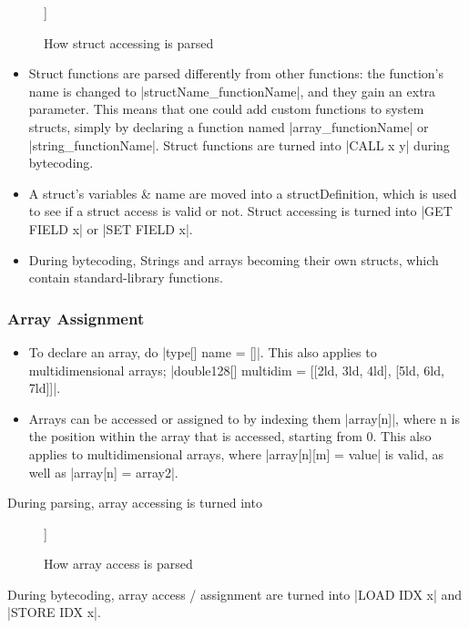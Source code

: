 \documentclass[12pt, letterpaper, oneside]{article}
\begin{document}
	\begin{figure}[h]
		\begin{forest}
			[STRUCT DECLARATION
			[Left: IDENTIFIER(structName)]
			[Right: IDENTIFIER(member)]
			]
		\end{forest}
		\caption{How struct accessing is parsed}
	\end{figure}
	\newpage
	\begin{itemize}
		\item[--] Struct functions are parsed differently from other functions: the function's name is changed to \spverb|structName_functionName|, and they gain an extra parameter. This means that one could add custom functions to system structs, simply by declaring a function named \spverb|array_functionName| or \spverb|string_functionName|. Struct functions are turned into \spverb|CALL x y| during bytecoding.
		\item[--] A struct's variables \& name are moved into a structDefinition, which is used to see if a struct access is valid or not. Struct accessing is turned into \spverb|GET FIELD x| or \spverb|SET FIELD x|.
		\item[--] During bytecoding, Strings and arrays becoming their own structs, which contain standard-library functions.
	\end{itemize} \newpage
	\subsubsection{Array Assignment}
	\begin{itemize}
		\item[--] To declare an array, do \spverb|type[] name = []|. This also applies to \newline multidimensional arrays; \spverb|double128[] multidim = [[2ld, 3ld, 4ld], [5ld, 6ld, 7ld]]|. 
		\item[--] Arrays can be accessed or assigned to by indexing them \spverb|array[n]|, where n is the position within the array that is accessed, starting from 0. This also applies to multidimensional arrays, where \spverb|array[n][m] = value| is valid, as well as \spverb|array[n] = array2|.
	\end{itemize}
	During parsing, array accessing is turned into 
	
	\begin{figure}[h]
		\begin{forest}
			[ARRAY\_ACCESS
			[Left: IDENTIFIER(name)]
			[Right: NUMBER(index)]
			]
		\end{forest}
		\caption{How array access is parsed}	
	\end{figure} 
	During bytecoding, array access / assignment are turned into \spverb|LOAD IDX x| and \spverb|STORE IDX x|. \newpage 
\end{document}
